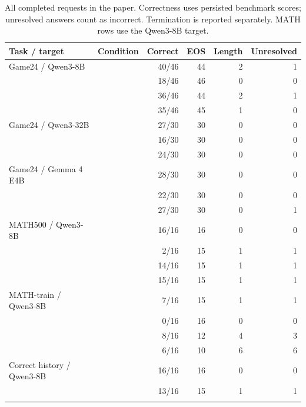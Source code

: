 \begin{table}[H]
\centering
\caption{All completed requests in the paper. Correctness uses persisted benchmark scores; unresolved answers count as incorrect. Termination is reported separately. MATH rows use the Qwen3-8B target.}
\label{tab:diagnostics}
\begin{tabular}{llrrrr}
\toprule
Task / target & Condition & Correct & EOS & Length & Unresolved \\
\midrule
Game24 / Qwen3-8B & \clean{} & 40/46 & 44 & 2 & 1 \\
 & \fullaccess{} & 18/46 & 46 & 0 & 0 \\
 & \lateblock{} & 36/46 & 44 & 2 & 1 \\
 & \pathblock{} & 35/46 & 45 & 1 & 0 \\
\addlinespace[3pt]
Game24 / Qwen3-32B & \clean{} & 27/30 & 30 & 0 & 0 \\
 & \fullaccess{} & 16/30 & 30 & 0 & 0 \\
 & \lateblock{} & 24/30 & 30 & 0 & 0 \\
\addlinespace[3pt]
Game24 / Gemma 4 E4B & \clean{} & 28/30 & 30 & 0 & 0 \\
 & \fullaccess{} & 22/30 & 30 & 0 & 0 \\
 & \lateblock{} & 27/30 & 30 & 0 & 1 \\
\addlinespace[3pt]
MATH500 / Qwen3-8B & \clean{} & 16/16 & 16 & 0 & 0 \\
 & \fullaccess{} & 2/16 & 15 & 1 & 1 \\
 & \lateblock{} & 14/16 & 15 & 1 & 1 \\
 & \pathblock{} & 15/16 & 15 & 1 & 1 \\
\addlinespace[3pt]
MATH-train / Qwen3-8B & \clean{} & 7/16 & 15 & 1 & 1 \\
 & \fullaccess{} & 0/16 & 16 & 0 & 0 \\
 & \lateblock{} & 8/16 & 12 & 4 & 3 \\
 & \pathblock{} & 6/16 & 10 & 6 & 6 \\
\addlinespace[3pt]
Correct history / Qwen3-8B & \fullaccess{} & 16/16 & 16 & 0 & 0 \\
 & \lateblock{} & 13/16 & 15 & 1 & 1 \\
\addlinespace[3pt]
\bottomrule
\end{tabular}
\end{table}
